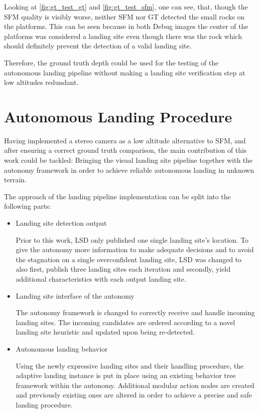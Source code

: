 Looking at \cref{fig:gt_test_gt} and \cref{fig:gt_test_sfm}, one can see, that, though the SFM quality is visibly worse, neither SFM nor GT detected the small rocks on the platforms. This can be seen because in both Debug images the center of the platforms was considered a landing site even though there was the rock which should definitely prevent the detection of a valid landing site.

Therefore, the ground truth depth could be used for the testing of the autonomous landing pipeline without making a landing site verification step at low altitudes redundant.


\section{Autonomous Landing Procedure}

Having implemented a stereo camera as a low altitude alternative to SFM, and after ensuring a correct ground truth comparison, the main contribution of this work could be tackled: Bringing the visual landing site pipeline together with the autonomy framework in order to achieve reliable autonomous landing in unknown terrain.

The approach of the landing pipeline implementation can be split into the following parts:

\begin{itemize}
    \item Landing site detection output

    Prior to this work, LSD only published one single landing site's location. To give the autonomy more information to make adequate decisions and to avoid the stagnation on a single overconfident landing site, LSD was changed to also first, publish three landing sites each iteration and secondly, yield additional characteristics with each output landing site.
    \item Landing site interface of the autonomy

    The autonomy framework is changed to correctly receive and handle incoming landing sites. The incoming candidates are ordered according to a novel landing site heuristic and updated upon being re-detected.
    \item Autonomous landing behavior

    Using the newly expressive landing sites and their handling procedure, the adaptive landing instance is put in place using an existing behavior tree framework within the autonomy. Additional modular action nodes are created and previously existing ones are altered in order to achieve a precise and safe landing procedure.
\end{itemize}

